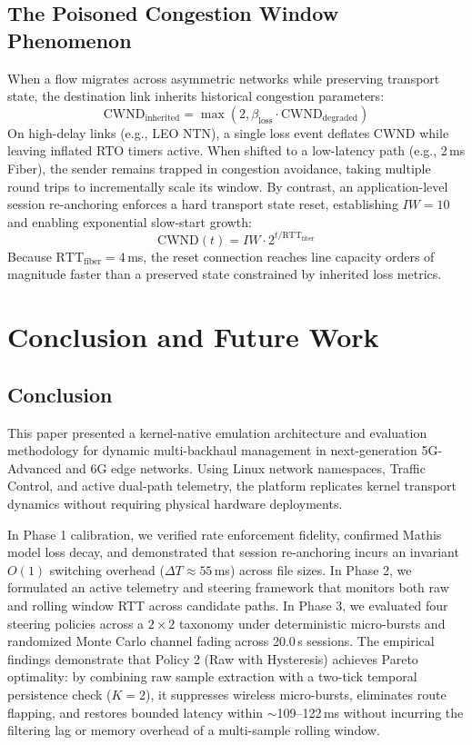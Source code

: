 \documentclass[conference]{IEEEtran}
\begin{document}
\subsection{The Poisoned Congestion Window Phenomenon}
When a flow migrates across asymmetric networks while preserving transport state, the destination link inherits historical congestion parameters:
\begin{equation}
\text{CWND}_{\text{inherited}} = \max\left(2, \beta_{\text{loss}} \cdot \text{CWND}_{\text{degraded}}\right)
\end{equation}
On high-delay links (e.g., LEO NTN), a single loss event deflates CWND while leaving inflated RTO timers active. When shifted to a low-latency path (e.g., 2\,ms Fiber), the sender remains trapped in congestion avoidance, taking multiple round trips to incrementally scale its window. By contrast, an application-level session re-anchoring enforces a hard transport state reset, establishing $IW = 10$ and enabling exponential slow-start growth:
\begin{equation}
\text{CWND}(t) = IW \cdot 2^{t / \text{RTT}_{\text{fiber}}}
\end{equation}
Because $\text{RTT}_{\text{fiber}} = 4$\,ms, the reset connection reaches line capacity orders of magnitude faster than a preserved state constrained by inherited loss metrics.

\section{Conclusion and Future Work}

\subsection{Conclusion}
This paper presented a kernel-native emulation architecture and evaluation methodology for dynamic multi-backhaul management in next-generation 5G-Advanced and 6G edge networks. Using Linux network namespaces, Traffic Control, and active dual-path telemetry, the platform replicates kernel transport dynamics without requiring physical hardware deployments. 

In Phase 1 calibration, we verified rate enforcement fidelity, confirmed Mathis model loss decay, and demonstrated that session re-anchoring incurs an invariant $O(1)$ switching overhead ($\Delta T \approx 55$\,ms) across file sizes. In Phase 2, we formulated an active telemetry and steering framework that monitors both raw and rolling window RTT across candidate paths. In Phase 3, we evaluated four steering policies across a $2 \times 2$ taxonomy under deterministic micro-bursts and randomized Monte Carlo channel fading across 20.0\,s sessions. The empirical findings demonstrate that Policy 2 (Raw with Hysteresis) achieves Pareto optimality: by combining raw sample extraction with a two-tick temporal persistence check ($K=2$), it suppresses wireless micro-bursts, eliminates route flapping, and restores bounded latency within $\sim$109--122\,ms without incurring the filtering lag or memory overhead of a multi-sample rolling window.
\end{document}
